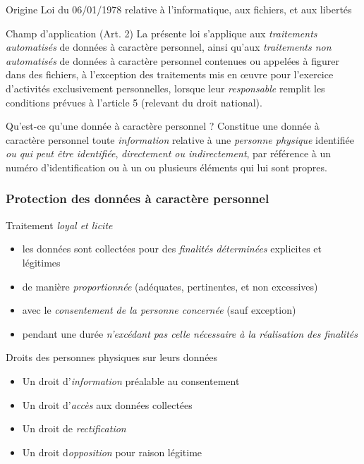 \begin{reveals}
\begin{frame}
  \vfill
  \begin{block}{Origine}
    Loi du 06/01/1978 relative à l'informatique, aux fichiers, et aux libertés
  \end{block}
  \vfill
  \begin{block}{Champ d'application (Art. 2)}
    \small La présente loi s'applique aux \emph{traitements
      automatisés} de données à caractère personnel, ainsi qu’aux
    \emph{traitements non automatisés} de données à caractère
    personnel contenues ou appelées à figurer dans des fichiers, à
    l'exception des traitements mis en \oe uvre pour l’exercice
    d’activités exclusivement personnelles, lorsque leur
    \emph{responsable} remplit les conditions prévues à l’article 5
    (relevant du droit national).
  \end{block}
  \vfill
  \begin{block}{Qu'est-ce qu'une donnée à caractère personnel ?}\small
    Constitue une donnée à caractère personnel toute
    \emph{information} relative à une \emph{personne physique}
    identifiée \emph{ou qui peut être identifiée}, \emph{directement
      ou indirectement}, par référence à un numéro d’identification ou
    à un ou plusieurs éléments qui lui sont propres.
  \end{block}
  \vfill
\end{frame}

\begin{frame}
  \frametitle{Protection des données à caractère personnel}
  \vfill
  \begin{block}{Traitement \emph{loyal et licite}}\small
    \begin{itemize}
    \item les données sont collectées pour des \emph{finalités
        déterminées} explicites et légitimes
    \item de manière \emph{proportionnée} (adéquates, pertinentes, et
      non excessives)
    \item avec le \emph{consentement de la personne concernée} (sauf
      exception)
    \item pendant une durée \emph{n'excédant pas celle nécessaire à la
        réalisation des finalités}
    \end{itemize}
  \end{block}
  \vfill
  \begin{block}{Droits des personnes physiques sur leurs données}\small
    \begin{itemize}
    \item Un droit d'\emph{information} préalable au consentement 
    \item Un droit d'\emph{accès} aux données collectées
    \item Un droit de \emph{rectification}
    \item Un droit d\emph{opposition} pour raison légitime
    \end{itemize}
  \end{block}
\end{frame}


\end{reveals}
